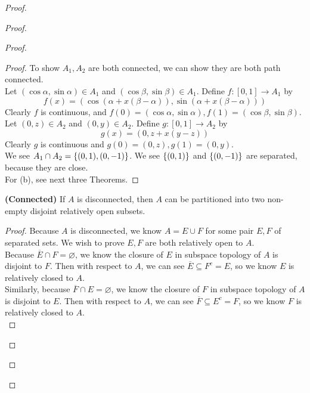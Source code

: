 \documentclass{report}
\begin{document}
\begin{proof}
\begin{proof}
\begin{proof}
\begin{proof}
To show $A_1,A_2$ are both connected, we can show they are both path connected.\\

Let $(\cos \alpha ,\sin \alpha  )\in A_1$ and $(\cos \beta ,\sin \beta )\in A_1$. Define $f:[0,1]\rightarrow A_1$ by
\begin{equation}
 f(x)=(\cos (\alpha +x(\beta -\alpha )), \sin (\alpha +x(\beta -\alpha )))
\end{equation}
Clearly $f$ is continuous, and  $f(0)=(\cos \alpha ,\sin \alpha ),f(1)=(\cos \beta ,\sin \beta )$.\\

Let $(0,z)\in A_2$ and $(0,y)\in A_2$. Define $g:[0,1]\rightarrow A_2$ by
\begin{equation}
g(x)=(0,z+x(y-z))
\end{equation}
Clearly $g$ is continuous and  $g(0)=(0,z),g(1)=(0,y)$.\\


We see $A_1\cap A_2=\{ (0,1),(0,-1) \}$. We see $\{ (0,1) \}$ and $\{ (0,-1) \}$ are separated, because they are close.\\

For (b), see next three Theorems.
\end{proof}
\begin{theorem}
\label{8.3.1}
\textbf{(Connected)} If $A$ is disconnected, then $A$ can be partitioned into two non-empty disjoint relatively open subsets. 
\end{theorem}
\begin{proof}
Because $A$ is disconnected, we know  $A=E\cup F$ for some pair $E,F$ of separated sets. We wish to prove $E,F$ are both relatively open to $A$.\\

Because $\overline{E}\cap F=\varnothing$, we know the closure of $E$ in subspace topology of $A$ is disjoint to $F$. Then with respect to $A$, we can see $\overline{E}\subseteq F^c=E$, so we know $E$ is relatively closed to  $A$.\\


Similarly, because $\overline{F}\cap E=\varnothing$, we know the closure of $F$ in subspace topology of $A$ is disjoint to $E$. Then with respect to $A$, we can see $\overline{F}\subseteq E^c=F$, so we know $F$ is relatively closed to  $A$.\\


\end{proof}
\end{proof}
\end{proof}
\end{proof}
\end{document}
